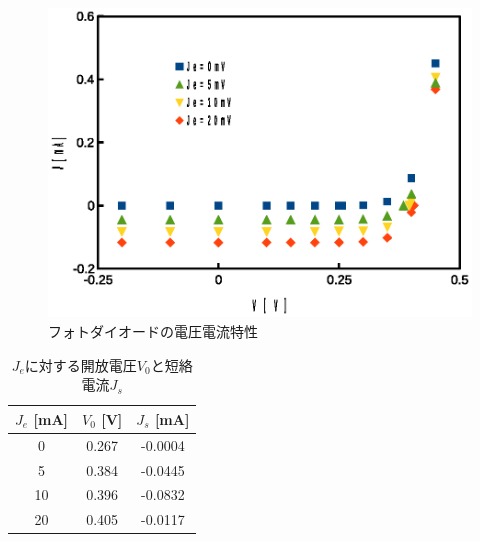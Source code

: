 \documentclass[11pt,a4]{jarticle}
\begin{document}
\begin{figure}[!htbp]
   \begin{center}
    \includegraphics[width=0.8\hsize]{./photodiode.eps}
    \caption{フォトダイオードの電圧電流特性}
     \label{fig:photodiode}
   \end{center}
\end{figure}
\begin{table}[!htbp]
   \begin{center}
  \begin{tabular}{ccc}
    $J_e$ [mA]  & $V_0$ [V] & $J_s$ [mA]\\ \hline
    0 & 0.267 & -0.0004 \\
    5 & 0.384 & -0.0445 \\
    10 & 0.396 & -0.0832 \\
    20 & 0.405 & -0.0117 \\
  \end{tabular}
  \label{tab:Je_Vo_Js}
     \end{center}
       \caption{$J_e$に対する開放電圧$V_0$と短絡電流$J_s$}
\end{table}
\end{document}
